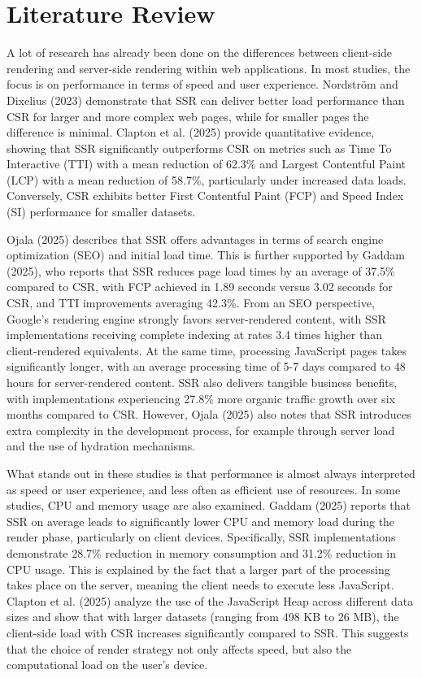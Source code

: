 \section{Literature Review}

A lot of research has already been done on the differences between client-side rendering and server-side rendering within web applications. In most studies, the focus is on performance in terms of speed and user experience. Nordström and Dixelius (2023) demonstrate that SSR can deliver better load performance than CSR for larger and more complex web pages, while for smaller pages the difference is minimal. Clapton et al. (2025) provide quantitative evidence, showing that SSR significantly outperforms CSR on metrics such as Time To Interactive (TTI) with a mean reduction of 62.3\% and Largest Contentful Paint (LCP) with a mean reduction of 58.7\%, particularly under increased data loads. Conversely, CSR exhibits better First Contentful Paint (FCP) and Speed Index (SI) performance for smaller datasets.

Ojala (2025) describes that SSR offers advantages in terms of search engine optimization (SEO) and initial load time. This is further supported by Gaddam (2025), who reports that SSR reduces page load times by an average of 37.5\% compared to CSR, with FCP achieved in 1.89 seconds versus 3.02 seconds for CSR, and TTI improvements averaging 42.3\%. From an SEO perspective, Google's rendering engine strongly favors server-rendered content, with SSR implementations receiving complete indexing at rates 3.4 times higher than client-rendered equivalents. At the same time, processing JavaScript pages takes significantly longer, with an average processing time of 5-7 days compared to 48 hours for server-rendered content. SSR also delivers tangible business benefits, with implementations experiencing 27.8\% more organic traffic growth over six months compared to CSR. However, Ojala (2025) also notes that SSR introduces extra complexity in the development process, for example through server load and the use of hydration mechanisms.

What stands out in these studies is that performance is almost always interpreted as speed or user experience, and less often as efficient use of resources. In some studies, CPU and memory usage are also examined. Gaddam (2025) reports that SSR on average leads to significantly lower CPU and memory load during the render phase, particularly on client devices. Specifically, SSR implementations demonstrate 28.7\% reduction in memory consumption and 31.2\% reduction in CPU usage. This is explained by the fact that a larger part of the processing takes place on the server, meaning the client needs to execute less JavaScript. Clapton et al. (2025) analyze the use of the JavaScript Heap across different data sizes and show that with larger datasets (ranging from 498 KB to 26 MB), the client-side load with CSR increases significantly compared to SSR. This suggests that the choice of render strategy not only affects speed, but also the computational load on the user's device.

